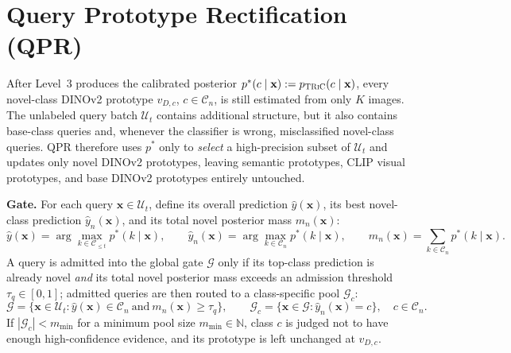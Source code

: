 \documentclass{iutbscthesis}
\begin{document}
\section{Query Prototype Rectification (QPR)}
\label{sec:qpr}

After Level~3 produces the calibrated posterior $p^*(c \mid \mathbf{x}) := p_{\textsc{TRiC}}(c \mid \mathbf{x})$, every novel-class DINOv2 prototype $v_{D,c}$, $c \in \mathcal{C}_n$, is still estimated from only $K$ images. The unlabeled query batch $\mathcal{U}_t$ contains additional structure, but it also contains base-class queries and, whenever the classifier is wrong, misclassified novel-class queries. QPR therefore uses $p^*$ only to \emph{select} a high-precision subset of $\mathcal{U}_t$ and updates only novel DINOv2 prototypes, leaving semantic prototypes, CLIP visual prototypes, and base DINOv2 prototypes entirely untouched.

\textbf{Gate.} For each query $\mathbf{x} \in \mathcal{U}_t$, define its overall prediction $\hat y(\mathbf{x})$, its best novel-class prediction $\hat y_n(\mathbf{x})$, and its total novel posterior mass $m_n(\mathbf{x})$:
\begin{equation}
    \hat y(\mathbf{x}) = \arg\max_{k \in \mathcal{C}_{\le t}} p^*(k \mid \mathbf{x}), \qquad
    \hat y_n(\mathbf{x}) = \arg\max_{k \in \mathcal{C}_n} p^*(k \mid \mathbf{x}), \qquad
    m_n(\mathbf{x}) = \sum_{k \in \mathcal{C}_n} p^*(k \mid \mathbf{x}).
    \label{eq:gatequantities}
\end{equation}
A query is admitted into the global gate $\mathcal{G}$ only if its top-class prediction is already novel \emph{and} its total novel posterior mass exceeds an admission threshold $\tau_q \in [0,1]$; admitted queries are then routed to a class-specific pool $\mathcal{G}_c$:
\begin{equation}
    \mathcal{G} = \{\mathbf{x} \in \mathcal{U}_t : \hat y(\mathbf{x}) \in \mathcal{C}_n \ \text{and} \ m_n(\mathbf{x}) \ge \tau_q\}, \qquad
    \mathcal{G}_c = \{\mathbf{x} \in \mathcal{G} : \hat y_n(\mathbf{x}) = c\}, \quad c \in \mathcal{C}_n.
    \label{eq:gate}
\end{equation}
If $|\mathcal{G}_c| < m_{\min}$ for a minimum pool size $m_{\min} \in \mathbb{N}$, class $c$ is judged not to have enough high-confidence evidence, and its prototype is left unchanged at $v_{D,c}$.
\end{document}
